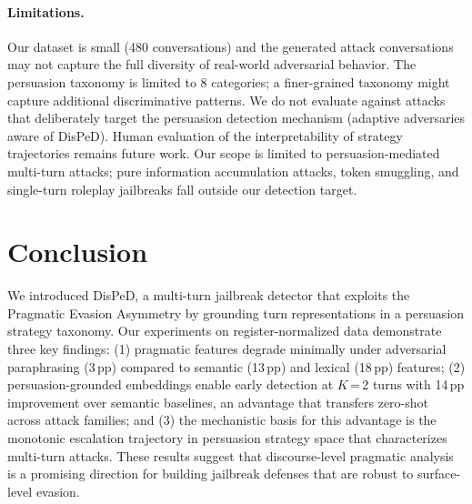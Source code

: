 \documentclass[11pt,a4paper]{article}
\begin{document}
\paragraph{Limitations.}
Our dataset is small (480 conversations) and the generated attack conversations may not capture the full diversity of real-world adversarial behavior. The persuasion taxonomy is limited to 8 categories; a finer-grained taxonomy might capture additional discriminative patterns. We do not evaluate against attacks that deliberately target the persuasion detection mechanism (adaptive adversaries aware of DisPeD). Human evaluation of the interpretability of strategy trajectories remains future work. Our scope is limited to persuasion-mediated multi-turn attacks; pure information accumulation attacks, token smuggling, and single-turn roleplay jailbreaks fall outside our detection target.

\section{Conclusion}

We introduced DisPeD, a multi-turn jailbreak detector that exploits the Pragmatic Evasion Asymmetry by grounding turn representations in a persuasion strategy taxonomy. Our experiments on register-normalized data demonstrate three key findings: (1) pragmatic features degrade minimally under adversarial paraphrasing (3\,pp) compared to semantic (13\,pp) and lexical (18\,pp) features; (2) persuasion-grounded embeddings enable early detection at $K$\,=\,2 turns with 14\,pp improvement over semantic baselines, an advantage that transfers zero-shot across attack families; and (3) the mechanistic basis for this advantage is the monotonic escalation trajectory in persuasion strategy space that characterizes multi-turn attacks. These results suggest that discourse-level pragmatic analysis is a promising direction for building jailbreak defenses that are robust to surface-level evasion.


\end{document}
